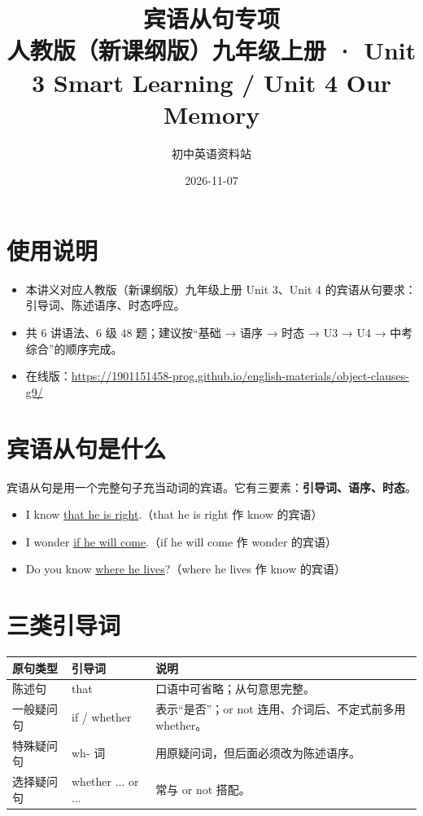 \documentclass[11pt,a4paper]{ctexart}
\title{\textbf{宾语从句专项}\\[4pt]
\large 人教版（新课纲版）九年级上册 · Unit 3 Smart Learning / Unit 4 Our Memory}
\author{初中英语资料站}
\date{2026-11-07}
\begin{document}
\maketitle

\section*{使用说明}
\begin{itemize}[leftmargin=1.4em]
\item 本讲义对应人教版（新课纲版）九年级上册 Unit 3、Unit 4 的宾语从句要求：引导词、陈述语序、时态呼应。
\item 共 6 讲语法、6 级 48 题；建议按“基础 → 语序 → 时态 → U3 → U4 → 中考综合”的顺序完成。
\item 在线版：\url{https://1901151458-prog.github.io/english-materials/object-clauses-g9/}
\end{itemize}

\section{宾语从句是什么}
宾语从句是用一个完整句子充当动词的宾语。它有三要素：\textbf{引导词、语序、时态}。
\begin{itemize}[leftmargin=1.4em]
\item I know \underline{that he is right}.（that he is right 作 know 的宾语）
\item I wonder \underline{if he will come}.（if he will come 作 wonder 的宾语）
\item Do you know \underline{where he lives}?（where he lives 作 know 的宾语）
\end{itemize}

\section{三类引导词}
\begin{center}
\begin{tabular}{p{3.2cm}p{3.2cm}p{7.4cm}}
\hline
\textbf{原句类型} & \textbf{引导词} & \textbf{说明}\\
\hline
陈述句 & that & 口语中可省略；从句意思完整。\\
一般疑问句 & if / whether & 表示“是否”；or not 连用、介词后、不定式前多用 whether。\\
特殊疑问句 & wh- 词 & 用原疑问词，但后面必须改为陈述语序。\\
选择疑问句 & whether ... or ... & 常与 or not 搭配。\\
\hline
\end{tabular}
\end{center}
\end{document}
